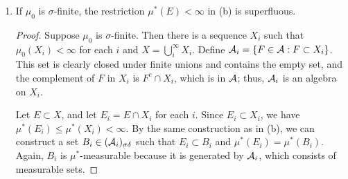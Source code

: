 \documentclass[10pt]{article}
\begin{document}
\begin{enumerate}
\begin{enumerate}
\begin{proof}
Now, suppose $E$ is $\mu^*$-measurable.  Then $\mu^*(B) = \mu^*(B \cap E) + \mu^*(B \cap E^c) = \mu^*(E) + \mu^*(B \setminus E)$.  Since $\mu^*(E) < \infty$, this gives $\mu^*(B \setminus E) = \mu^*(B) - \mu^*(E) = 0$.

For the reverse direction, suppose there is some $B \in \A_{\sigma \delta}$ such that $E \subset B$ and $\mu^*(B \setminus E) = 0$.  Then for any $F \subset X$,
$$
\mu^*(F) \leq \mu^*((B \setminus E) \cap F) + \mu^*((B \setminus E) \cap F^c) \leq \mu^*(B \setminus E) + \mu^*(B \setminus E) = 0
$$
so all inequalities are equalities, hence $B \setminus E$ is $\mu^*$-measurable.  We already know that $B$ is $\mu^*$-measurable, since it is in the $\sigma$-algebra generated by $\A$.  Therefore, $E = B \setminus (B \setminus E)$ is $\mu^*$-measurable.
\end{proof}

\item If $\mu_0$ is $\sigma$-finite, the restriction $\mu^*(E) < \infty$ in (b) is superfluous.

\begin{proof}
Suppose $\mu_0$ is $\sigma$-finite.  Then there is a sequence $X_i$ such that $\mu_0(X_i) < \infty$ for each $i$ and $X = \bigcup_i^\infty X_i$.  Define $\mathcal{A}_i = \{F \in \mathcal{A} : F \subset X_i\}$.  This set is clearly closed under finite unions and contains the empty set, and the complement of $F$ in $X_i$ is $F^c \cap X_i$, which is in $\A$; thus, $\mathcal{A}_i$ is an algebra on $X_i$.

Let $E \subset X$, and let $E_i = E \cap X_i$ for each $i$.  Since $E_i \subset X_i$, we have $\mu^*(E_i) \leq \mu^*(X_i) < \infty$.  By the same construction as in (b), we can construct a set $B_i \in (\mathcal{A}_i)_{\sigma \delta}$ such that $E_i \subset B_i$ and $\mu^*(E_i) = \mu^*(B_i)$.  Again, $B_i$ is $\mu^*$-measurable because it is generated by $\mathcal{A}_i$, which consists of measurable sets.


\end{proof}
\end{enumerate}
\end{enumerate}
\end{document}
